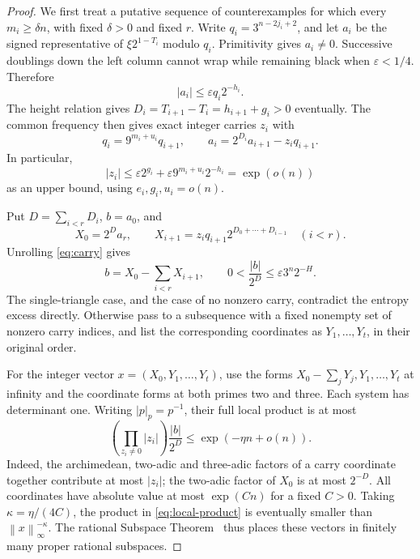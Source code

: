 \documentclass[11pt,a4paper]{article}
\newcommand{\eps}{\varepsilon}
\newcommand{\norm}[1]{\left\lVert#1\right\rVert}
\newcommand{\abs}[1]{\left|#1\right|}
\begin{document}
\begin{proof}
We first treat a putative sequence of counterexamples for which every
\(m_i\ge\delta n\), with fixed \(\delta>0\) and fixed \(r\).
Write \(q_i=3^{n-2j_i+2}\), and let \(a_i\) be the signed representative
of \(\xi2^{1-T_i}\) modulo \(q_i\). Primitivity gives \(a_i\ne0\).
Successive doublings down the left column cannot wrap while remaining
black when \(\eps<1/4\). Therefore
\begin{equation}\label{eq:black-numerator}
 \abs{a_i}\le\eps q_i2^{-h_i}.
\end{equation}
The height relation gives
\(D_i=T_{i+1}-T_i=h_{i+1}+g_i>0\) eventually.
The common frequency then gives exact integer carries \(z_i\) with
\begin{equation}\label{eq:carry}
 q_i=9^{m_i+u_i}q_{i+1},\qquad
 a_i=2^{D_i}a_{i+1}-z_iq_{i+1}.
\end{equation}
In particular,
\[
 \abs{z_i}\le\eps2^{g_i}
       +\eps9^{m_i+u_i}2^{-h_i}=\exp(o(n))
\]
as an upper bound, using \(e_i,g_i,u_i=o(n)\).

Put \(D=\sum_{i<r}D_i\), \(b=a_0\), and
\[
 X_0=2^Da_r,\qquad
 X_{i+1}=z_iq_{i+1}2^{D_0+\cdots+D_{i-1}}\quad(i<r).
\]
Unrolling \eqref{eq:carry} gives
\begin{equation}\label{eq:residual}
 b=X_0-\sum_{i<r}X_{i+1},\qquad
 0<\frac{\abs b}{2^D}\le\eps3^n2^{-H}.
\end{equation}
The single-triangle case, and the case of no nonzero carry, contradict
the entropy excess directly. Otherwise pass to a subsequence with a
fixed nonempty set of nonzero carry indices, and list the corresponding
coordinates as \(Y_1,\ldots,Y_t\), in their original order.

For the integer vector \(x=(X_0,Y_1,\ldots,Y_t)\), use the forms
\(X_0-\sum_jY_j,Y_1,\ldots,Y_t\) at infinity and the coordinate forms
at both primes two and three. Each system has determinant one.
Writing \(\abs{p}_p=p^{-1}\), their full local product is at most
\begin{equation}\label{eq:local-product}
 \left(\prod_{z_i\ne0}\abs{z_i}\right)\frac{\abs b}{2^D}
 \le \exp(-\eta n+o(n)).
\end{equation}
Indeed, the archimedean, two-adic and three-adic factors of a carry
coordinate together contribute at most \(\abs{z_i}\); the two-adic
factor of \(X_0\) is at most \(2^{-D}\).
All coordinates have absolute value at most \(\exp(Cn)\) for a fixed
\(C>0\). Taking \(\kappa=\eta/(4C)\), the product in
\eqref{eq:local-product} is eventually smaller than
\(\norm{x}_\infty^{-\kappa}\). The rational Subspace
Theorem~\cite{Schlickewei} thus places
these vectors in finitely many proper rational subspaces.


\end{proof}
\end{document}
